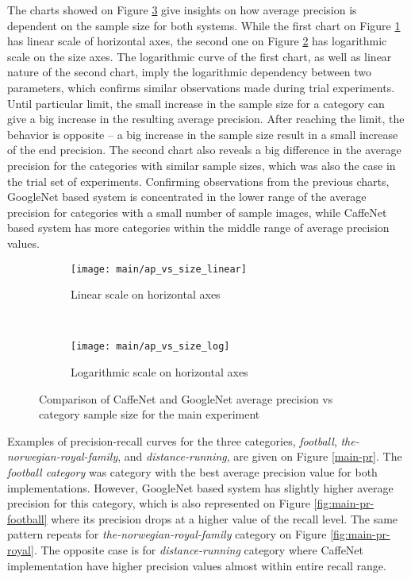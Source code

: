     The charts showed on Figure \ref{fig:main-ap-vs-size} give insights on how average precision is dependent on the sample size for both systems. While the first chart on Figure \ref{fig:main-ap-vs-size-linear} has linear scale of horizontal axes, the second one on Figure \ref{fig:main-ap-vs-size-log} has logarithmic scale on the size axes. The logarithmic curve of the first chart, as well as linear nature of the second chart, imply the logarithmic dependency between two parameters, which confirms similar observations made during trial experiments. Until particular limit, the small increase in the sample size for a category can give a big increase in the resulting average precision. After reaching the limit, the behavior is opposite -- a big increase in the sample size result in a small increase of the end precision. The second chart also reveals a big difference in the average precision for the categories with similar sample sizes, which was also the case in the trial set of experiments. Confirming observations from the previous charts, GoogleNet based system is concentrated in the lower range of the average precision for categories with a small number of sample images, while CaffeNet based system has more categories within the middle range of average precision values.
    
    \begin{figure}[H]
        \centering
        \begin{subfigure}[a]{\textwidth}
            \texttt{[image: main/ap\_vs\_size\_linear]}
            \caption{Linear scale on horizontal axes}
            \label{fig:main-ap-vs-size-linear}
        \end{subfigure}
        \\
        \begin{subfigure}[a]{\textwidth}
            \texttt{[image: main/ap\_vs\_size\_log]}
            \caption{Logarithmic scale on horizontal axes}
            \label{fig:main-ap-vs-size-log}
        \end{subfigure}
        \caption[Main experiment. Average precision vs size for CaffeNet and GoogleNet]{Comparison of CaffeNet and GoogleNet average precision vs category sample size for the main experiment}
        \label{fig:main-ap-vs-size}
    \end{figure}
    
    Examples of precision-recall curves for the three categories, \textit{football}, \textit{the-norwegian-royal-family}, and \textit{distance-running}, are given on Figure \ref{main-pr}. The \textit{football category} was category with the best average precision value for both implementations. However, GoogleNet based system has slightly higher average precision for this category, which is also represented on Figure \ref{fig:main-pr-football} where its precision drops at a higher value of the recall level. The same pattern repeats for \textit{the-norwegian-royal-family} category on Figure \ref{fig:main-pr-royal}. The opposite case is for \textit{distance-running} category where CaffeNet implementation have higher precision values almost within entire recall range.
    
